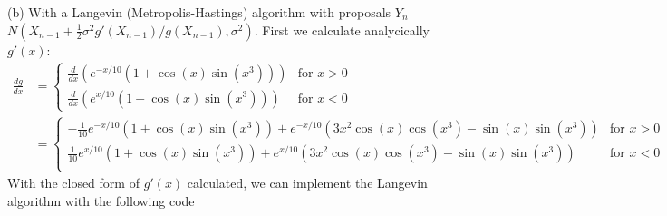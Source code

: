 
(b) With a Langevin (Metropolis-Hastings) algorithm with proposals $Y_n$~$N(X_{n-1}+\frac{1}{2}\sigma^2g'(X_{n-1})/g(X_{n-1}),\sigma^2)$.
First we calculate analycically $g'(x)$:
\begin{align*}
\frac{dg}{dx} &= 
\begin{cases}
  \frac{d}{dx}\left(e^{-x/10}(1+\cos(x)\sin(x^3))\right) &\text{for }x>0\\
  \frac{d}{dx}\left(e^{x/10}(1+\cos(x)\sin(x^3))\right) &\text{for }x<0
\end{cases}\\
  &=\begin{cases}
  -\frac{1}{10}e^{-x/10}(1+\cos(x)\sin(x^3)) +e^{-x/10}(3x^2\cos(x)\cos(x^3)-\sin(x)\sin(x^3)) &\text{for }x>0\\
  \frac{1}{10}e^{x/10}(1+\cos(x)\sin(x^3)) +e^{x/10}(3x^2\cos(x)\cos(x^3)-\sin(x)\sin(x^3)) &\text{for }x<0\\
  \end{cases}
\end{align*}
With the closed form of $g'(x)$ calculated, we can implement the Langevin algorithm with the following code
